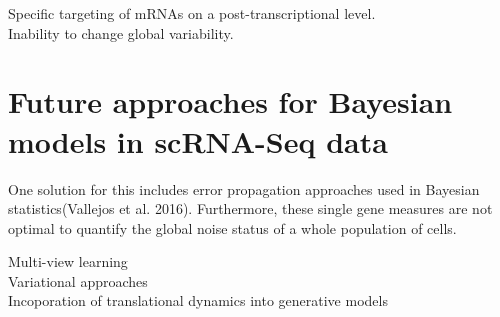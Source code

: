 Specific targeting of mRNAs on a post-transcriptional level.\\

Inability to change global variability. \\


\section{Future approaches for Bayesian models in scRNA-Seq data}

One solution for this includes error propagation approaches used in Bayesian statistics(Vallejos et al. 2016). Furthermore, these single gene measures are not optimal to quantify the global noise status of a whole population of cells.

Multi-view learning\\
Variational approaches\\
Incoporation of translational dynamics into generative models

